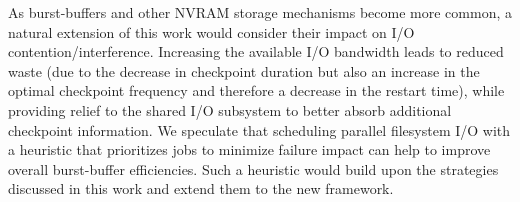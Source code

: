 \documentclass[conference,nofonttune]{IEEEtran}
\newcommand{\ie}[0]{\emph{i.e.}\xspace}
\begin{document}

As burst-buffers and other NVRAM storage mechanisms become more common, a natural
extension of this work would consider their impact on I/O contention/interference.
Increasing the available I/O
bandwidth leads to reduced waste (due to the decrease in checkpoint duration but also
an increase in the optimal checkpoint frequency and therefore a decrease in the
restart time), while providing relief to the shared I/O subsystem to better absorb
additional checkpoint information. We speculate that scheduling parallel filesystem
I/O with a heuristic that prioritizes jobs to minimize failure impact can help to
improve overall burst-buffer efficiencies. Such a heuristic would build upon the
strategies discussed in this work and extend them to the new framework.
\end{document}
